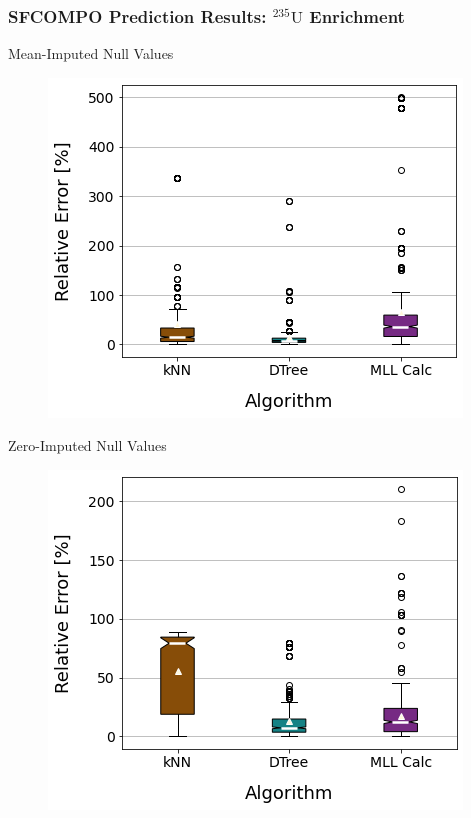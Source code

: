 \begin{frame}
  \frametitle{SFCOMPO Prediction Results: ${}^{235}\text{U}$ Enrichment}
  \begin{adjustwidth}{-15pt}{0pt}
  \begin{minipage}{0.5\textwidth}
    \begin{block}{Mean-Imputed Null Values}
      \begin{figure}
        \centering
        \includegraphics[width=\textwidth]{./figures/sfcompo_boxplots_impnull_pcterr_enri.png}
      \end{figure}
    \end{block}
  \end{minipage}%
  \hfill
  \begin{minipage}{0.5\textwidth}
    \begin{block}{Zero-Imputed Null Values}
      \begin{figure}
        \centering
        \includegraphics[width=\textwidth]{./figures/sfcompo_boxplots_0null_pcterr_enri.png}
      \end{figure}
    \end{block}
  \end{minipage}
  \end{adjustwidth}
\end{frame}

